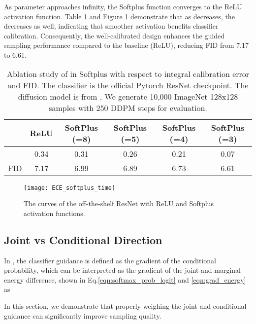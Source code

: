 \documentclass{article}
\theoremstyle{definition}
\begin{document}
As parameter  approaches infinity, the Softplus function converges to the ReLU activation function. 
Table \ref{table:ECE_softplus_beta} and Figure \ref{fig:ECE_softplus_time} demonstrate that as  decreases, the  decreases as well, indicating that smoother activation benefits classifier calibration. Consequently, the well-calibrated design enhances the guided sampling performance compared to the baseline (ReLU), reducing FID from 7.17 to 6.61.
\begin{table}[h!]
\caption{Ablation study of  in Softplus with respect to integral calibration error  and FID. The classifier is the official Pytorch ResNet checkpoint. The diffusion model is from \cite{dhariwal2021diffusion}. We generate 10,000 ImageNet 128x128 samples with 250 DDPM steps for evaluation.}
\label{table:ECE_softplus_beta}
\begin{center}
\begin{small}
\begin{sc}
\begin{tabular}{lccccc}
\toprule
     & ReLU & SoftPlus (=8) & SoftPlus (=5) & SoftPlus (=4) & SoftPlus (=3) \\
\midrule
  & 0.34 & 0.31 & 0.26 & 0.21 & 0.07 \\
FID  & 7.17 & 6.99 & 6.89 &  6.73  & 6.61 \\
\bottomrule
\end{tabular}
\end{sc}
\end{small}
\end{center}
\end{table}


\begin{figure}[h]
  \centering
\texttt{[image: ECE\_softplus\_time]}
  \caption{The  curves of the off-the-shelf ResNet with ReLU and Softplus activation functions.}
  \label{fig:ECE_softplus_time}
\end{figure}


\subsection{Joint vs Conditional Direction}
In \cite{dhariwal2021diffusion}, the classifier guidance is defined as the gradient of the conditional probability, which can be interpreted as the gradient of the joint and marginal energy \citep{grathwohl2019your} difference, shown in Eq.\eqref{eqn:softmax_prob_logit} and \eqref{eqn:grad_energy} as


In this section, we demonstrate that properly weighing the joint and conditional guidance can significantly improve sampling quality. 
\end{document}
